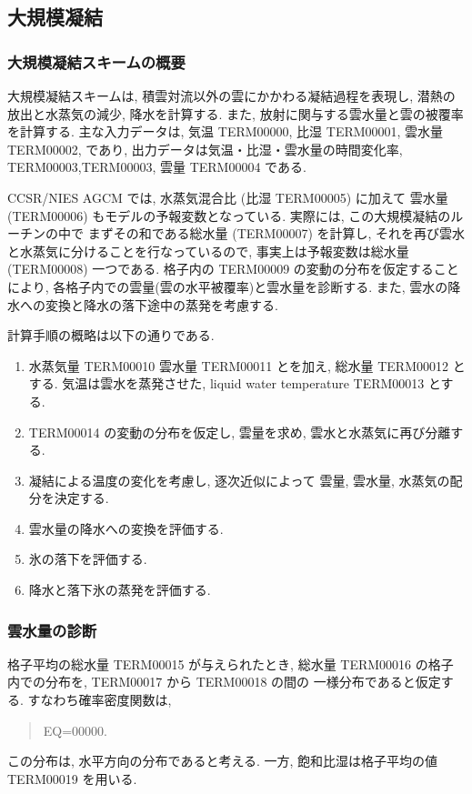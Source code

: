 ﻿
\subsection{大規模凝結}

\subsubsection{大規模凝結スキームの概要}

大規模凝結スキームは,
積雲対流以外の雲にかかわる凝結過程を表現し,
潜熱の放出と水蒸気の減少, 降水を計算する.
また, 放射に関与する雲水量と雲の被覆率を計算する.
主な入力データは, 気温 TERM00000, 比湿 TERM00001, 雲水量 TERM00002, であり,
出力データは気温・比湿・雲水量の時間変化率,
TERM00003,TERM00003,
雲量 TERM00004 である.

CCSR/NIES AGCM では, 水蒸気混合比 (比湿 TERM00005) に加えて
雲水量 (TERM00006) もモデルの予報変数となっている.
実際には, この大規模凝結のルーチンの中で
まずその和である総水量 (TERM00007) を計算し, 
それを再び雲水と水蒸気に分けることを行なっているので,
事実上は予報変数は総水量 (TERM00008) 一つである.
格子内の TERM00009 の変動の分布を仮定することにより,
各格子内での雲量(雲の水平被覆率)と雲水量を診断する.
また, 雲水の降水への変換と降水の落下途中の蒸発を考慮する.

計算手順の概略は以下の通りである.
%
\begin{enumerate}
\item 水蒸気量 TERM00010 雲水量 TERM00011 とを加え,
      総水量 TERM00012 とする.
      気温は雲水を蒸発させた, 
      liquid water temperature  TERM00013 とする.
\item TERM00014 の変動の分布を仮定し,
      雲量を求め, 雲水と水蒸気に再び分離する.
\item 凝結による温度の変化を考慮し,
      逐次近似によって
      雲量, 雲水量, 水蒸気の配分を決定する.
\item 雲水量の降水への変換を評価する.
\item 氷の落下を評価する.
\item 降水と落下氷の蒸発を評価する.
\end{enumerate}

\subsubsection{雲水量の診断}

格子平均の総水量 TERM00015 が与えられたとき,
総水量 TERM00016 の格子内での分布を,
TERM00017 から TERM00018 の間の
一様分布であると仮定する. すなわち確率密度関数は,
\begin{quote}
EQ=00000.
\end{quote}
この分布は, 水平方向の分布であると考える.
一方, 飽和比湿は格子平均の値 TERM00019 を用いる.

